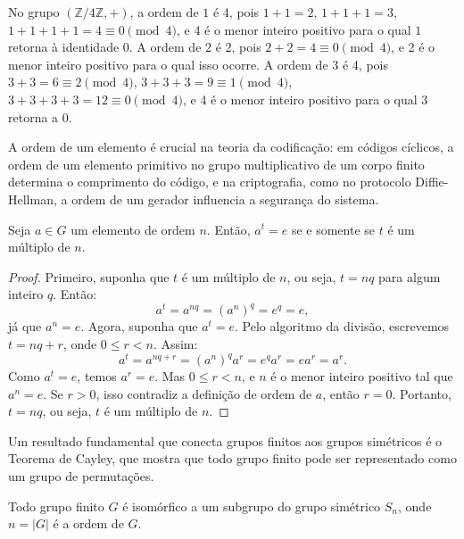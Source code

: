 \begin{example}
  No grupo $(\mathbb{Z}/4\mathbb{Z}, +)$, a ordem de $1$ é 4,
  pois $1 + 1 = 2$, $1 + 1 + 1 = 3$, $1 + 1 + 1 + 1 = 4 \equiv 0 \pmod{4}$,
  e 4 é o menor inteiro positivo para o qual $1$
  retorna à identidade 0.
  A ordem de $2$ é 2, pois $2 + 2 = 4 \equiv 0 \pmod{4}$, 
  e 2 é o menor inteiro positivo para o qual isso ocorre. 
  A ordem de $3$ é 4, pois $3 + 3 = 6 \equiv 2 \pmod{4}$, $3 + 3 + 3 = 9 \equiv 1 \pmod{4}$, $3 + 3 + 3 + 3 = 12 \equiv 0 \pmod{4}$,
  e 4 é o menor inteiro positivo para o qual $3$ retorna a 0.
\end{example}

A ordem de um elemento é crucial na teoria da
codificação: em códigos cíclicos, a ordem de um elemento primitivo no grupo
multiplicativo de um corpo finito determina o comprimento do código, e na
criptografia, como no protocolo Diffie-Hellman, a ordem de um gerador
influencia a segurança do sistema.






\begin{proposition}
  Seja $a \in G$ um elemento de ordem $n$. Então, $a^t = e$ se e somente se $t$
  é um múltiplo de $n$.
\end{proposition}
\begin{proof}
  Primeiro, suponha que $t$ é um múltiplo de $n$, ou seja, $t = nq$ para algum
  inteiro $q$. Então:
  \[
  a^t = a^{nq} = (a^n)^q = e^q = e,
  \]
  já que $a^n = e$. Agora, suponha que $a^t = e$. Pelo algoritmo da divisão,
  escrevemos $t = nq + r$, onde $0 \leq r < n$. Assim:
  \[
  a^t = a^{nq + r} = (a^n)^q a^r = e^q a^r = e a^r = a^r.
  \]
  Como $a^t = e$, temos $a^r = e$. Mas $0 \leq r < n$, e $n$ é o menor inteiro
  positivo tal que $a^n = e$. Se $r > 0$, isso contradiz a definição de ordem
  de $a$, então $r = 0$. Portanto, $t = nq$, ou seja, $t$ é um múltiplo de $n$. 
\end{proof}





Um resultado fundamental que conecta grupos finitos aos grupos simétricos é o
Teorema de Cayley, que mostra que todo grupo finito pode ser representado como
um grupo de permutações.

\begin{theorem}
  Todo grupo finito $G$ é isomórfico a um subgrupo do grupo simétrico
  $S_{n}$, onde $n = |G|$ é a ordem de $G$.
\end{theorem}

